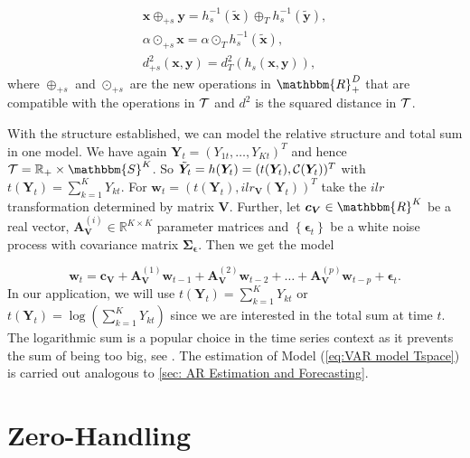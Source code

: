 \begin{gather}
\bm{x} \oplus_{+s} \bm{y} = h_s^{-1}(\tilde{\bm{x}}) \oplus_T  h_s^{-1}(\tilde{\bm{y}}), \\
\alpha \odot_{+s} \bm{x} = \alpha \odot_T h_s^{-1}(\tilde{\bm{x}}), \\
d_{+s}^2(\bm{x},\bm{y}) = d_T^2(h_s(\bm{x},\bm{y})),
\label{eq:Vector Space Operations sum}
\end{gather}
%
where $\oplus_{+s}$ and $\odot_{+s}$ are the new operations in $\mathbbm{R}_+^D$ that are compatible with the operations in $\mathcal{T}$ and $d^2$ is the squared distance in $\mathcal{T}$. 

With the structure established, we can model the relative structure and total sum in one model.  We have again $\bm{Y}_t=(Y_{1t},\ldots,Y_{Kt})^T$ and hence $\Tsp = \mathbb{R}_+ \times \mathbbm{S}^K$. So $\tilde{\bm{Y}}_t=h(\bm{Y}_t)=(t(\bm{Y}_t),\mathcal{C}(\bm{Y}_t))^T$ with $t(\bm{Y}_t)=\sum_{k=1}^K Y_{kt}$. For $\bm{w}_t =(t(\bm{Y}_t),ilr_{\bm{V}}(\bm{Y}_t))^T$ take the $ilr$ transformation determined by matrix $\bm{V}$. Further, let $\bm{c}_{\bm{V}} \in \mathbbm{R}^K$ be a real vector, $\textbf{A}_{\textbf{V}}^{(i)} \in \mathbb{R}^{K \times K}$ parameter matrices and $\left\{\bm{\epsilon}_t\right\}$ be a white noise process with covariance matrix $\bm{\Sigma_\epsilon}$. Then we get the model 

\begin{equation}
\textbf{w}_t = \textbf{c}_{\textbf{V}} + \textbf{A}_{\textbf{V}}^{(1)}\textbf{w}_{t-1} + \textbf{A}_{\textbf{V}}^{(2)}\textbf{w}_{t-2} + \ldots + \textbf{A}_{\textbf{V}}^{(p)}\textbf{w}_{t-p} + \bm{\epsilon}_{t}.
\label{eq:VAR model Tspace}
\end{equation}
%
In our application, we will use $t(\bm{Y}_t)=\sum_{k=1}^K Y_{kt}$ or $t(\bm{Y}_t)=\log(\sum_{k=1}^K Y_{kt})$ since we are interested in the total sum at time $t$. The logarithmic sum is a popular choice in the time series context as it prevents the sum of being too big, see \textcite{Kynclova:2015}. The estimation of Model (\ref{eq:VAR model Tspace}) is carried out analogous to \ref{sec: AR Estimation and Forecasting}. 

\section{Zero-Handling}
\label{sec: Zero-Handling}

